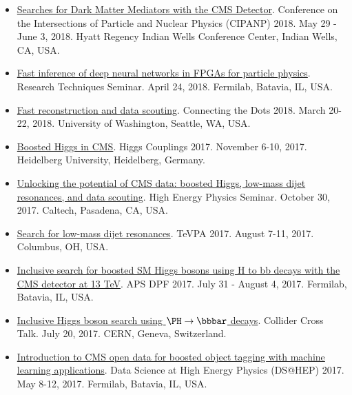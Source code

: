 \documentclass[11pt]{res}
\begin{document}
\begin{resume}
\begin{itemize}
    \item \href{https://conferences.lbl.gov/event/137/session/27/contribution/354}{Searches for Dark Matter Mediators with the CMS Detector}. Conference on the Intersections of Particle and Nuclear Physics (CIPANP) 2018. May 29 - June 3, 2018. Hyatt Regency Indian Wells Conference Center, Indian Wells, CA, USA.
    \item \href{https://indico.fnal.gov/event/16908/}{Fast inference of deep neural networks in FPGAs for particle physics}. Research Techniques Seminar. April 24, 2018. Fermilab, Batavia, IL, USA.
    \item \href{https://indico.cern.ch/event/658267/contributions/2881127/}{Fast reconstruction and data scouting}. Connecting the Dots 2018. March 20-22, 2018. University of Washington, Seattle, WA, USA.
    \item \href{http://www.thphys.uni-heidelberg.de/~higgs/talks/duarte.pdf}{Boosted Higgs in CMS}. Higgs Couplings 2017. November 6-10, 2017. Heidelberg University, Heidelberg, Germany.
    \item \href{https://indico.hep.caltech.edu/indico/conferenceDisplay.py?confId=149}{Unlocking the potential of CMS data: boosted Higgs, low-mass dijet resonances, and data scouting}. High Energy Physics Seminar. October 30, 2017. Caltech, Pasadena, CA, USA.
    \item \href{https://indico.cern.ch/event/615891/contributions/2666361/}{Search for low-mass dijet resonances}. TeVPA 2017. August 7-11, 2017. Columbus, OH, USA.
    \item \href{https://indico.fnal.gov/contributionDisplay.py?sessionId=14&contribId=38&confId=11999}{Inclusive search for boosted SM Higgs bosons using H to bb decays with the CMS detector at 13 TeV}. APS DPF 2017. July 31 - August 4, 2017. Fermilab, Batavia, IL, USA.
    \item \href{https://indico.cern.ch/event/649575/}{Inclusive Higgs boson search using $\PH\to\bbbar$ decays}. Collider Cross Talk. July 20, 2017. CERN, Geneva, Switzerland.
    \item \href{https://indico.fnal.gov/contributionDisplay.py?sessionId=6&contribId=54&confId=13497}{Introduction to CMS open data for boosted object tagging with machine learning applications}. Data Science at High Energy Physics (DS@HEP) 2017. May 8-12, 2017. Fermilab, Batavia, IL, USA.
\end{itemize}
\end{resume}
\end{document}
